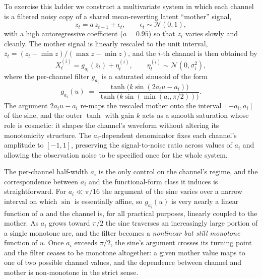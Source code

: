 \documentclass{article}
\theoremstyle{plain}
\theoremstyle{definition}
\theoremstyle{remark}
\begin{document}
To exercise this ladder we construct a multivariate system in which each channel is a filtered noisy copy of a shared mean-reverting latent ``mother'' signal,
\begin{equation*}
z_t = a\, z_{t-1} + \epsilon_t, \qquad \epsilon_t \sim \mathcal{N}(0,1),
\end{equation*}
with a high autoregressive coefficient ($a=0.95$) so that $z_t$ varies slowly and cleanly. The mother signal is linearly rescaled to the unit interval, $\bar z_t = (z_t - \min z)/(\max z - \min z)$, and the $i$-th channel is then obtained by
\begin{equation*}
X_t^{(i)} = g_{a_i}(\bar z_t) + \eta_t^{(i)}, \qquad \eta_t^{(i)} \sim \mathcal{N}(0, \sigma_i^2),
\end{equation*}
where the per-channel filter $g_{a_i}$ is a saturated sinusoid of the form
\begin{equation*}
g_{a_i}(u) \;=\; \frac{\tanh\!\big(k\sin(2 a_i u - a_i)\big)}{\tanh\!\big(k\sin(\min(a_i,\pi/2))\big)}.
\end{equation*}
The argument $2 a_i u - a_i$ re-maps the rescaled mother onto the interval $[-a_i, a_i]$ of the sine, and the outer $\tanh$ with gain $k$ acts as a smooth saturation whose role is cosmetic: it shapes the channel's waveform without altering its monotonicity structure. The $a_i$-dependent denominator fixes each channel's amplitude to $[-1,1]$, preserving the signal-to-noise ratio across values of $a_i$ and allowing the observation noise to be specified once for the whole system.

The per-channel half-width $a_i$ is the only control on the channel's regime, and the correspondence between $a_i$ and the functional-form class it induces is straightforward. For $a_i \ll \pi/16$ the argument of the sine varies over a narrow interval on which $\sin$ is essentially affine, so $g_{a_i}(u)$ is very nearly a linear function of $u$ and the channel is, for all practical purposes, linearly coupled to the mother. As $a_i$ grows toward $\pi/2$ the sine traverses an increasingly large portion of a single monotone arc, and the filter becomes a \emph{nonlinear but still monotone} function of $u$. Once $a_i$ exceeds $\pi/2$, the sine's argument crosses its turning point and the filter ceases to be monotone altogether: a given mother value maps to one of two possible channel values, and the dependence between channel and mother is non-monotone in the strict sense.
\end{document}
